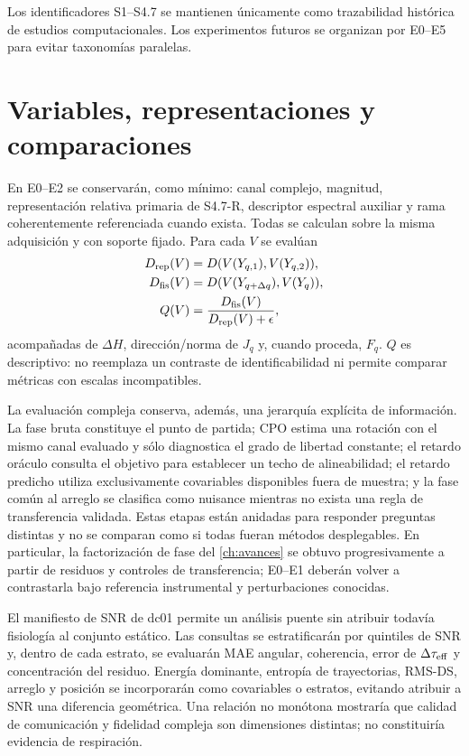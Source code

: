 Los identificadores S1--S4.7 se mantienen únicamente como trazabilidad histórica de estudios computacionales. Los experimentos futuros se organizan por E0--E5 para evitar taxonomías paralelas.

\section{Variables, representaciones y comparaciones}

En E0--E2 se conservarán, como mínimo: canal complejo, magnitud, representación relativa primaria de S4.7-R, descriptor espectral auxiliar y rama coherentemente referenciada cuando exista. Todas se calculan sobre la misma adquisición y con soporte fijado. Para cada $V$ se evalúan
\begin{align}
D_{\rm rep}(V)&=D(V(Y_{q,1}),V(Y_{q,2})),\\
D_{\rm fis}(V)&=D(V(Y_{q+\Delta q}),V(Y_q)),\\
Q(V)&=\frac{D_{\rm fis}(V)}{D_{\rm rep}(V)+\epsilon},
\end{align}
acompañadas de $\Delta H$, dirección/norma de $J_q$ y, cuando proceda, $F_q$. $Q$ es descriptivo: no reemplaza un contraste de identificabilidad ni permite comparar métricas con escalas incompatibles.

La evaluación compleja conserva, además, una jerarquía explícita de información.
La fase bruta constituye el punto de partida; CPO estima una rotación con el mismo
canal evaluado y sólo diagnostica el grado de libertad constante; el retardo
oráculo consulta el objetivo para establecer un techo de alineabilidad; el retardo
predicho utiliza exclusivamente covariables disponibles fuera de muestra; y la
fase común al arreglo se clasifica como nuisance mientras no exista una regla de
transferencia validada. Estas etapas están anidadas para responder preguntas
distintas y no se comparan como si todas fueran métodos desplegables. En particular,
la factorización de fase del \cref{ch:avances} se obtuvo progresivamente a partir
de residuos y controles de transferencia; E0--E1 deberán volver a contrastarla
bajo referencia instrumental y perturbaciones conocidas.

El manifiesto de SNR de dc01 permite un análisis puente sin atribuir todavía
fisiología al conjunto estático. Las consultas se estratificarán por quintiles de
SNR y, dentro de cada estrato, se evaluarán MAE angular, coherencia, error de
$\Delta\tau_{\rm eff}$ y concentración del residuo. Energía dominante, entropía
de trayectorias, RMS-DS, arreglo y posición se incorporarán como covariables o
estratos, evitando atribuir a SNR una diferencia geométrica. Una relación no
monótona mostraría que calidad de comunicación y fidelidad compleja son dimensiones
distintas; no constituiría evidencia de respiración.

